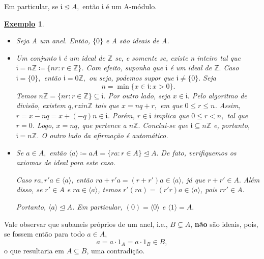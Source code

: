 \documentclass{article}
\newtheorem{example}{\underline{Exemplo}}
\begin{document}
Em particular, se \(\mathfrak{i} \trianglelefteq{A},\) então \(\mathfrak{i}\) é um A-módulo.
\begin{example}
  \begin{itemize}
    \item[i)] Seja A um anel. Então, \(\{0\}\) e A são ideais de A. 
    \item[ii)] Um conjunto \(\mathfrak{i}\) é um ideal de \(\mathbb{Z}\) se, e somente se, existe n inteiro tal que \(\mathfrak{i} = n \mathbb{Z}\coloneqq \{nr:r\in \mathbb{Z}\}\).
      Com efeito, suponha que \(\mathfrak{i}\) é um ideal de \(\mathbb{Z}.\) Caso \(\mathfrak{i} = \{0\},\) então \(\mathfrak{i} = 0 \mathbb{Z},\) ou seja, podemos supor que \(\mathfrak{i}\neq \{0\}.\) Seja 
      \[
        n = \min\{x\in \mathfrak{i}: x > 0\}.
      \]
      Temos \(n \mathbb{Z} = \{nr:r\in \mathbb{Z}\}\subseteq \mathfrak{i}\). Por outro lado, seja \(x\in \mathfrak{i}.\) Pelo algoritmo de divisão, existem
      \(q, rzin \mathbb{Z}\) tais que \(x = nq + r,\) em que \( 0 \leq r \leq n\). Assim, \(r = x-nq = x + (-q)n\in \mathfrak{i}\).
      Porém, \(r\in \mathfrak{i}\) implica que \(0\leq r < n,\) tal que \( r = 0\). Logo,
      \(x = nq \), que pertence a \(n \mathbb{Z}.\) Conclui-se que \(\mathfrak{i}\subseteq n \mathbb{Z}\) e, portanto, \(\mathfrak{i} = n \mathbb{Z}\). O outro lado da 
      afirmação é automático.
    \item[iii)] Se \(a\in A,\) então \(\langle a \rangle\coloneqq aA = \{ra: r\in A\}\trianglelefteq{A}.\) De fato,
      verifiquemos os axiomas de ideal para este caso.

      Caso \(ra, r'a\in \langle a \rangle\), então \(ra + r'a = (r+r')a\in \langle a \rangle\), já que \(r + r'\in A.\)
      Além disso, se \(r'\in A\) e \(ra\in \langle a \rangle\), temos \(r'(ra) = (r'r)a\in \langle a \rangle\), pois \(rr'\in A.\)

      Portanto, \(\langle a \rangle \trianglelefteq{A}\). Em particular, \((0) = \langle 0 \rangle\) e \(\langle 1 \rangle = A.\)
  \end{itemize}
\end{example}
Vale observar que subaneis próprios de um anel, i.e., \(B\subsetneq A\), \textbf{não} são ideais, pois, se fossem então para todo \(a\in A,\) 
\[
  a = a \cdot 1_{A} = a \cdot 1_{B}\in B,
\]
o que resultaria em \(A\subseteq B\), uma contradição.
\end{document}
